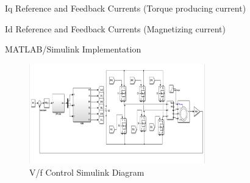 \begin{frame}{Iq Reference and Feedback Currents (Torque producing current)}
	\begin{figure}
		\centering


	\end{figure}
\end{frame}

\begin{frame}{Id Reference and Feedback Currents (Magnetizing current)}
	\begin{figure}
		\centering


	\end{figure}
\end{frame}



\begin{frame}{MATLAB/Simulink Implementation}
	\begin{figure}
		\includegraphics[width=3in]{conference/vfSimulation.png} %
		\caption{V/f Control Simulink Diagram}
	\end{figure}
\end{frame}


